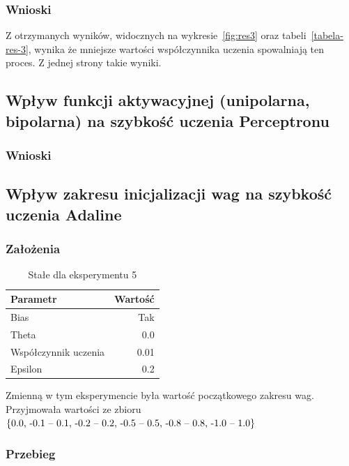 \documentclass{article}
\begin{document}
\subsubsection*{Wnioski}

Z otrzymanych wyników, widocznych na wykresie~\ref{fig:res3} oraz tabeli~\ref{tabela-res-3}, wynika że mniejsze wartości współczynnika uczenia spowalniają ten proces. Z jednej strony takie wyniki.

\newpage
\subsection{Wpływ funkcji aktywacyjnej (unipolarna, bipolarna) na szybkość uczenia Perceptronu}
\subsubsection*{Wnioski}

\newpage
\subsection{Wpływ zakresu inicjalizacji wag na szybkość uczenia Adaline}
\subsubsection*{Założenia}
\begin{table}[!h]
	\caption{Stałe dla eksperymentu 5}
	\label{tabela-const-5}
	\centering
	\begin{tabular}{lr}
		\toprule
		Parametr               & Wartość \\
		\midrule
		Bias                   & Tak       \\
		Theta                  & 0.0       \\
		Współczynnik uczenia & 0.01      \\
		Epsilon                & 0.2       \\
		\bottomrule
	\end{tabular}
\end{table}

Zmienną w tym eksperymencie była wartość początkowego zakresu wag. Przyjmowała wartości ze zbioru \(\{$0.0, -0.1 -- 0.1, -0.2 -- 0.2, -0.5 -- 0.5, -0.8 -- 0.8, -1.0 -- 1.0$\}\)

\subsubsection*{Przebieg}
\end{document}

